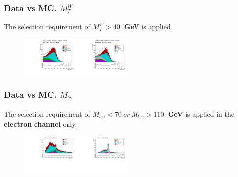 \begin{frame}\frametitle{Data vs MC. $M_T^W$}
\scriptsize
The selection requirement of {\bfseries{$M_T^W>40$~GeV}} is applied.
\begin{figure}[htb]
  \begin{center}
   \includegraphics[width=0.25\textwidth]{../figs/figs_v11/MUON_WGamma/PrepareYields/c_TotalDATAvsMC_EtaCommon__WMtVERY_PRELIMINARY.pdf}\includegraphics[width=0.25\textwidth]{../figs/figs_v11/ELECTRON_WGamma/PrepareYields/c_TotalDATAvsMC_EtaCommon__WMtVERY_PRELIMINARY.pdf}
  \label{fig:DATAvsMC_WMt}
  \end{center}
\end{figure}
\end{frame}

\begin{frame}\frametitle{Data vs MC. $M_{l\gamma}$}
\scriptsize
The selection requirement of {\bfseries{$M_{l,\gamma}<70~or~M_{l,\gamma}>110$~GeV}} is applied in the {\bfseries{electron channel}} only.
\begin{figure}[htb]
  \begin{center}
   \includegraphics[width=0.25\textwidth]{../figs/figs_v11/MUON_WGamma/PrepareYields/c_TotalDATAvsMC_EtaCommon__Mpholep1_pt15to500_.pdf}\includegraphics[width=0.25\textwidth]{../figs/figs_v11/ELECTRON_WGamma/PrepareYields/c_TotalDATAvsMC_EtaCommon__Mpholep1PRELIMINARY_FOR_E_TO_GAMMA_WITH_PSV_CUT_pt15to500_.pdf}
  \label{fig:DATAvsMC_WMt}
  \end{center}
\end{figure}
\end{frame}


